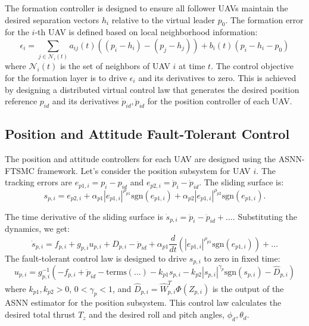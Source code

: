 The formation controller is designed to ensure all follower UAVs maintain the desired separation vectors $h_i$ relative to the virtual leader $p_0$. The formation error for the $i$-th UAV is defined based on local neighborhood information:
\begin{equation}
    \epsilon_i = \sum_{j \in \mathcal{N}_i(t)} a_{ij}(t) \left( (p_i - h_i) - (p_j - h_j) \right) + b_i(t) (p_i - h_i - p_0)
    \label{eq:formation_error}
\end{equation}
where $\mathcal{N}_i(t)$ is the set of neighbors of UAV $i$ at time $t$. The control objective for the formation layer is to drive $\epsilon_i$ and its derivatives to zero. This is achieved by designing a distributed virtual control law that generates the desired position reference $p_{id}$ and its derivatives $\dot{p}_{id}, \ddot{p}_{id}$ for the position controller of each UAV.

\subsection{Position and Attitude Fault-Tolerant Control}
\label{subsec:position_attitude_control}

The position and attitude controllers for each UAV are designed using the ASNN-FTSMC framework. Let's consider the position subsystem for UAV $i$. The tracking errors are $e_{p1,i} = p_i - p_{id}$ and $e_{p2,i} = \dot{p}_i - \dot{p}_{id}$. The sliding surface is:
\begin{equation}
    s_{p,i} = e_{p2,i} + \alpha_{p1} |e_{p1,i}|^{\rho_{p1}} \text{sgn}(e_{p1,i}) + \alpha_{p2} |e_{p1,i}|^{\rho_{p2}} \text{sgn}(e_{p1,i}).
    \label{eq:position_sliding}
\end{equation}

The time derivative of the sliding surface is $\dot{s}_{p,i} = \ddot{p}_i - \ddot{p}_{id} + \dots$. Substituting the dynamics, we get:
\begin{equation}
    \dot{s}_{p,i} = f_{p,i} + g_{p,i} u_{p,i} + D_{p,i} - \ddot{p}_{id} + \alpha_{p1} \frac{d}{dt}(|e_{p1,i}|^{\rho_{p1}} \text{sgn}(e_{p1,i})) + \dots
    \label{eq:sliding_derivative}
\end{equation}
The fault-tolerant control law is designed to drive $s_{p,i}$ to zero in fixed time:
\begin{equation}
    u_{p,i} = g_{p,i}^{-1} \left( -f_{p,i} + \ddot{p}_{id} - \text{terms}(\dots) - k_{p1} s_{p,i} - k_{p2} |s_{p,i}|^{\gamma_p} \text{sgn}(s_{p,i}) - \hat{D}_{p,i} \right)
    \label{eq:position_control}
\end{equation}
where $k_{p1}, k_{p2} > 0$, $0 < \gamma_p < 1$, and $\hat{D}_{p,i} = \hat{W}_{p,i}^T \Phi(Z_{p,i})$ is the output of the ASNN estimator for the position subsystem. This control law calculates the desired total thrust $T_z$ and the desired roll and pitch angles, $\phi_d, \theta_d$.

